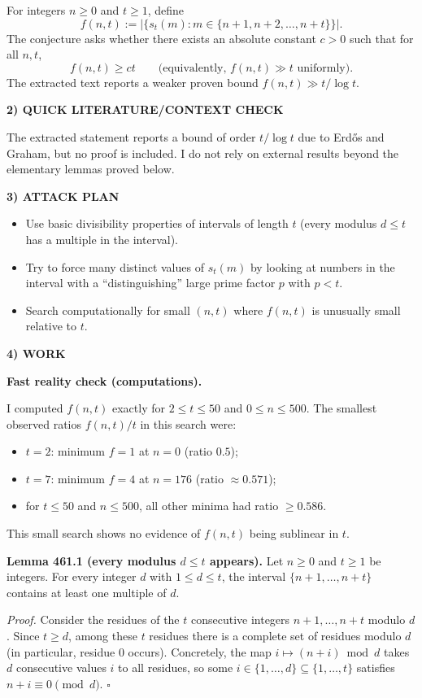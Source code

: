 For integers $n\ge 0$ and $t\ge 1$, define
\[f(n,t):=\left|\{s_t(m): m\in\{n+1,n+2,\dots,n+t\}\}\right|.
\]
The conjecture asks whether there exists an absolute constant $c>0$ such that for all $n,t$,
\[f(n,t)\ge c t\qquad\text{(equivalently, }f(n,t)\gg t\text{ uniformly).}
\]
The extracted text reports a weaker proven bound $f(n,t)\gg t/\log t$.

\noindent\textbf{2) QUICK LITERATURE/CONTEXT CHECK}

The extracted statement reports a bound of order $t/\log t$ due to Erd\H{o}s and Graham, but no proof is included. I do not rely on external results beyond the elementary lemmas proved below.

\noindent\textbf{3) ATTACK PLAN}

\begin{itemize}
\item Use basic divisibility properties of intervals of length $t$ (every modulus $d\le t$ has a multiple in the interval).
\item Try to force many distinct values of $s_t(m)$ by looking at numbers in the interval with a ``distinguishing'' large prime factor $p$ with $p<t$.
\item Search computationally for small $(n,t)$ where $f(n,t)$ is unusually small relative to $t$.
\end{itemize}

\noindent\textbf{4) WORK}

\textbf{Fast reality check (computations).}

I computed $f(n,t)$ exactly for $2\le t\le 50$ and $0\le n\le 500$.  The smallest observed ratios $f(n,t)/t$ in this search were:
\begin{itemize}
\item $t=2$: minimum $f=1$ at $n=0$ (ratio $0.5$);
\item $t=7$: minimum $f=4$ at $n=176$ (ratio $\approx 0.571$);
\item for $t\le 50$ and $n\le 500$, all other minima had ratio $\ge 0.586$.
\end{itemize}
This small search shows no evidence of $f(n,t)$ being sublinear in $t$.

\medskip
\noindent\textbf{Lemma 461.1 (every modulus $d\le t$ appears).}
Let $n\ge 0$ and $t\ge 1$ be integers. For every integer $d$ with $1\le d\le t$, the interval $\{n+1,\dots,n+t\}$ contains at least one multiple of $d$.

\textit{Proof.}
Consider the residues of the $t$ consecutive integers $n+1,\dots,n+t$ modulo $d$. Since $t\ge d$, among these $t$ residues there is a complete set of residues modulo $d$ (in particular, residue $0$ occurs). Concretely, the map $i\mapsto (n+i)\bmod d$ takes $d$ consecutive values $i$ to all residues, so some $i\in\{1,\dots,d\}\subseteq\{1,\dots,t\}$ satisfies $n+i\equiv 0\pmod d$. \hfill$\square$

